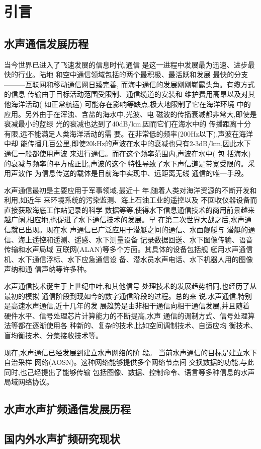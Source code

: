 \section{引言}
\subsection{水声通信发展历程}
当今世界已进入了飞速发展的信息时代,通信
是这一进程中发展最为迅速、进步最快的行业。陆地
和空中通信领域包括的两个最积极、最活跃和发展
最快的分支———互联网和移动通信网日臻完善,
而海中通信的发展刚刚崭露头角。有缆方式的信息
传输由于目标活动范围受限制、通信缆道的安装和
维护费用高昂以及对其他海洋活动( 如正常航运)
可能存在影响等缺点,极大地限制了它在海洋环境
中的应用。另外由于在浑浊、含盐的海水中,光波、电
磁波的传播衰减都非常大,即使是衰减最小的蓝绿
光的衰减也达到了40dB/km,因而它们在海水中的
传播距离十分有限,远不能满足人类海洋活动的需
要。在非常低的频率(200Hz以下),声波在海洋中却
能传播几百公里,即使20kHz的声波在水中的衰减也只有2-3dB/km,因此水下通信一般都使用声波
来进行通信。而在这个频率范围内,声波在水中( 包
括海水)的衰减与频率的平方成正比,声波的这个
特性导致了水下声信道是带宽受限的。采用声波作
为信息传送的载体是目前海中实现中、远距离无线
通信的唯一手段。

水声通信最初是主要应用于军事领域,最近十
年,随着人类对海洋资源的不断开发和利用,如近年
来环境系统的污染监测、海上石油工业的遥控以及
不回收仪器设备而直接获取海底工作站记录的科学
数据等等,使得水下信息通信技术的商用前景越来
越广阔,相应地,也促进了水下通信技术的发展。早
在第二次世界大战之后,水声通信就已出现。现在水
声通信已广泛应用于潜艇之间的通信、水面舰艇与
潜艇的通信、海上遥控和遥测、遥感、水下测量设备
记录数据回送、水下图像传输、语音传输和水声局域
互联网(ALAN)等多个方面。其具体的设备包括舰
艇用水声通信机、水下通信浮标、水下应急通信设
备、潜水员水声电话、水下机器人用的图像声纳和通
信声纳等许多种。

水声通信技术诞生于上世纪中叶,和其他信号
处理技术的发展趋势相同,也经历了从最初的模拟
通信阶段到现如今的数字通信阶段的过程。总的来
说,水声通信,特别是高速水声通信,近十几年的发
展趋势是由非相干通信向相干通信发展,并且随着
硬件水平、信号处理芯片计算能力的不断提高,水声
通信的调制方式、信号处理算法等都在逐渐使用各
种新的、复杂的技术,比如空间调制技术、自适应均
衡技术、盲均衡技术、分集接收技术等。

现在,水声通信已经发展到建立水声网络的阶
段。
当前水声通信的目标是建立水下自治采样
网络(AOSN)。这种网络能够提供多个网络节点间
交换数据的功能,与此同时,也己经提出了能够传输
包括图像、数据、控制命令、语言等多种信息的水声
局域网络协议。

 






\subsection{水声水声扩频通信发展历程}

\subsection{国内外水声扩频研究现状}